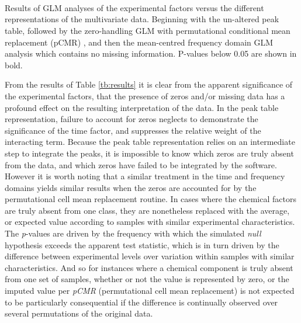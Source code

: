 \documentclass[preprint,12pt]{elsarticle}
\begin{document}
\begin{table} %
 \\
 \\ 
 \\

\caption{Results of GLM analyses of the experimental factors versus the different representations of the multivariate data. Beginning with the un-altered peak table, followed by the zero-handling GLM with permutational conditional mean replacement (pCMR) \cite{pCMR}, and then the mean-centred frequency domain GLM analysis which contains no missing information. P-values below 0.05 are shown in bold.}
\label{tb:results}

\end{table}

From the results of Table \ref{tb:results} it is clear from the apparent significance of the experimental factors, that the presence of zeros and/or missing data has a profound effect on the resulting interpretation of the data. In the peak table representation, failure to account for zeros neglects to demonstrate the significance of the time factor, and suppresses the relative weight of the interacting term. Because the peak table representation relies on an intermediate step to integrate the peaks, it is impossible to know which zeros are truly absent from the data, and which zeros have failed to be integrated by the software. However it is worth noting that a similar treatment in the time and frequency domains yields similar results when the zeros are accounted for by the permutational cell mean replacement routine. In cases where the chemical factors are truly absent from one class, they are nonetheless replaced with the average, or expected value according to samples with similar experimental characteristics. The \textit{p}-values are driven by the frequency with which the simulated \textit{null} hypothesis exceeds the apparent test statistic, which is in turn driven by the difference between experimental levels over variation within samples with similar characteristics. And so for instances where a chemical component is truly absent from one set of samples, whether or not the value is represented by zero, or the imputed value per \textit{pCMR} (permutational cell mean replacement) is not expected to be particularly consequential if the difference is continually observed over several permutations of the original data.
\end{document}
